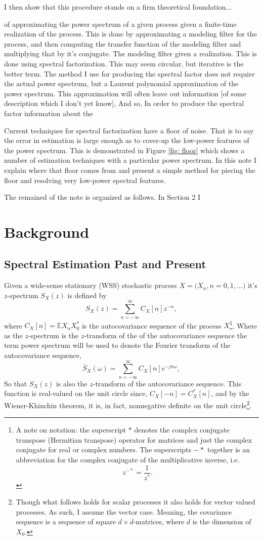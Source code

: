 \documentclass[12pt]{amsart}
\newcommand{\E}{\mathbb{E}}
\begin{document}
I then show that this procedure stands on a firm theoretical foundation...

of approximating the power spectrum of a given process given a finite-time realization of the process. This is done by approximating a modeling filter for the process, and then computing the transfer function of the modeling filter and multiplying that by it's conjugate. The modeling filter given a realization. This is done using spectral factorization. This may seem circular, but iterative is the better term. The method I use for producing the spectral factor does not require the actual power spectrum, but a Laurent polynomial approximation of the power spectrum. This approximation will often leave out information [of some description which I don't yet know], And so,  In order to produce the spectral factor information about the 


Current techniques for spectral factorization have a floor of noise. That is to say the error in estimation is large enough as to cover-up the low-power features of the power spectrum. This is demonstrated in Figure \ref{fig: floor} which shows a number of estimation techniques with a particular power spectrum. In this note I explain where that floor comes from and present a simple method for piecing the floor and resolving very low-power spectral features. 


The remained of the note is organized as follows. In Section 2 I 
\section{Background}
\subsection{Spectral Estimation Past and Present}

Given a wide-sense stationary (WSS) stochastic process $X = \big(X_n, n = 0, 1, \dots\big)$ it's $z$-spectrum $S_X(z)$ is defined by
$$S_X(z) = \sum_{n=-\infty}^\infty C_X[n]z^{-n},$$
where $C_X[n] = \E X_nX_0^*$ is the autocovariance sequence of the process $X$\footnote{
	A note on notation: the superscript $*$ denotes the complex conjugate transpose (Hermitian transpose) operator for matrices and just the complex conjugate for real or complex numbers. The superscripts $-*$ together is an abbreviation for the complex conjugate of the multiplicative inverse, i.e. $$z^{-*} = \frac{1}{z^*}.$$
}. Where as the $z$-spectrum is the $z$-transform of the of the autocovariance sequence the term power spectrum will be used to denote the Fourier transform of the autocovariance sequence, 
$$\bar{S}_X(\omega) = \sum_{n=-\infty}^\infty C_X[n]e^{-jn\omega},$$
So that $S_X(z)$ is also the $z$-transform of the autocovariance sequence. This function is real-valued on the unit circle since, $C_X[-n] = C_X^*[n]$, and by the Wiener-Khinchin theorem, it is, in fact, nonnegative definite on the unit circle\footnote{
	Though what follows holds for scalar processes it also holds for vector valued processes. As such, I assume the vector case. Meaning, the covariance sequence is a sequence of square $d\times d$-matrices, where $d$ is the dimension of $X_0$.}.
\end{document}
